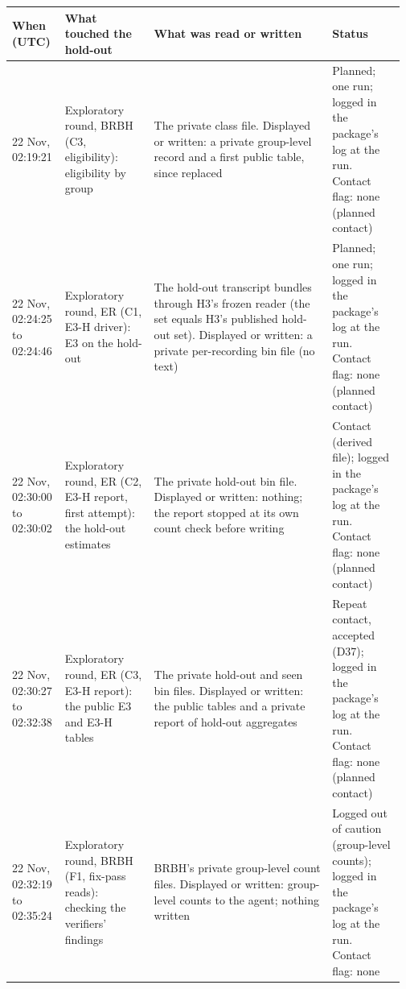 {\scriptsize\setlength{\tabcolsep}{2pt}
\begin{tabular}{@{}p{0.13\linewidth}p{0.22\linewidth}p{0.44\linewidth}p{0.18\linewidth}@{}}
\toprule
When (UTC) & What touched the hold-out & What was read or written & Status \\
\midrule
22 Nov, 02:19:21 & Exploratory round, BRBH (C3, eligibility): eligibility by group & The private class file. Displayed or written: a private group-level record and a first public table, since replaced & Planned; one run; logged in the package's log at the run. Contact flag: none (planned contact) \\
22 Nov, 02:24:25 to 02:24:46 & Exploratory round, ER (C1, E3-H driver): E3 on the hold-out & The hold-out transcript bundles through H3's frozen reader (the set equals H3's published hold-out set). Displayed or written: a private per-recording bin file (no text) & Planned; one run; logged in the package's log at the run. Contact flag: none (planned contact) \\
22 Nov, 02:30:00 to 02:30:02 & Exploratory round, ER (C2, E3-H report, first attempt): the hold-out estimates & The private hold-out bin file. Displayed or written: nothing; the report stopped at its own count check before writing & Contact (derived file); logged in the package's log at the run. Contact flag: none (planned contact) \\
22 Nov, 02:30:27 to 02:32:38 & Exploratory round, ER (C3, E3-H report): the public E3 and E3-H tables & The private hold-out and seen bin files. Displayed or written: the public tables and a private report of hold-out aggregates & Repeat contact, accepted (D37); logged in the package's log at the run. Contact flag: none (planned contact) \\
22 Nov, 02:32:19 to 02:35:24 & Exploratory round, BRBH (F1, fix-pass reads): checking the verifiers' findings & BRBH's private group-level count files. Displayed or written: group-level counts to the agent; nothing written & Logged out of caution (group-level counts); logged in the package's log at the run. Contact flag: none \\

\end{tabular}}
